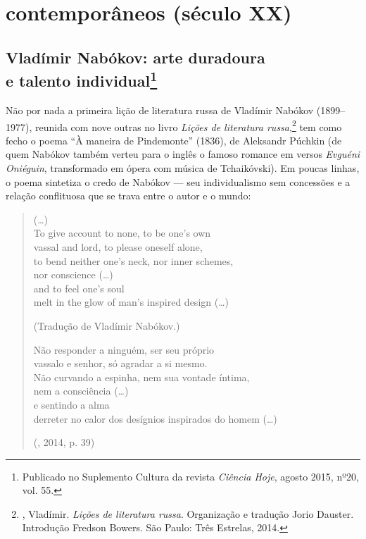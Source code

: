 \part{contemporâneos (século XX)}

\chapter{Vladímir Nabókov: arte duradoura\\ e talento individual\footnote{Publicado no Suplemento Cultura da revista \emph{Ciência Hoje}, agosto 2015, nº20, vol. 55.}}
\label{nabokov}

Não por nada a primeira lição de literatura russa de Vladímir Nabókov
(1899--1977), reunida com nove outras no livro \emph{Lições de
literatura russa},\footnote{, Vladímir. \emph{Lições de literatura russa}. Organização e tradução Jorio Dauster. Introdução Fredson Bowers. São Paulo: Três Estrelas, 2014.} tem como fecho o poema
``À maneira de Pindemonte'' (1836), de Aleksandr Púchkin (de quem Nabókov
também verteu para o inglês o famoso romance em versos
\emph{Evguéni Oniéguin}, transformado em ópera com música de
Tchaikóvski). Em poucas linhas, o poema sintetiza o credo de Nabókov ---
seu individualismo sem concessões e a relação conflituosa que se trava
entre o autor e o mundo:

\begin{verse}
(\ldots{})\\
To give account to none, to be one's own \\
vassal and lord, to please oneself alone,\\
to bend neither one's neck, nor inner schemes, \\
nor conscience (\ldots{}) \\
and to feel one's soul \\
melt in the glow of man's inspired design (\ldots{})

(Tradução de Vladímir Nabókov.)

Não responder a ninguém, ser seu próprio \\
vassalo e senhor, só agradar a si mesmo. \\
Não curvando a espinha, nem sua vontade \qb{}íntima, \\
nem a consciência (\ldots{}) \\
e sentindo a alma \\
derreter no calor dos desígnios inspirados \qb{}do homem (\ldots{})

(, 2014, p. 39)
\end{verse}

